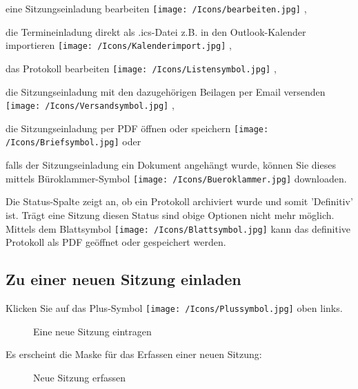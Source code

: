 \begin{compactitem}
	\item eine Sitzungseinladung bearbeiten \texttt{[image: /Icons/bearbeiten.jpg]} ,
	\item die Termineinladung direkt als .ics-Datei z.B. in den Outlook-Kalender importieren \texttt{[image: /Icons/Kalenderimport.jpg]} ,
	\item das Protokoll bearbeiten \texttt{[image: /Icons/Listensymbol.jpg]} ,
	\item die Sitzungseinladung mit den dazugehörigen Beilagen per Email versenden \texttt{[image: /Icons/Versandsymbol.jpg]} ,
	\item die Sitzungseinladung per PDF öffnen oder speichern \texttt{[image: /Icons/Briefsymbol.jpg]}  oder
	\item falls der Sitzungseinladung ein Dokument angehängt wurde, können Sie dieses mittels Büroklammer-Symbol \texttt{[image: /Icons/Bueroklammer.jpg]}  downloaden.
	\end{compactitem}

\vspace{\baselineskip}

Die Status-Spalte  zeigt an, ob ein Protokoll archiviert wurde und somit 'Definitiv' ist. Trägt eine Sitzung diesen Status sind obige Optionen nicht mehr möglich. Mittels dem Blattsymbol \texttt{[image: /Icons/Blattsymbol.jpg]} kann das definitive Protokoll als PDF geöffnet oder gespeichert werden.

\subsection{Zu einer neuen Sitzung einladen}
\label{bkm:Ref434828480}

Klicken Sie auf das Plus-Symbol \texttt{[image: /Icons/Plussymbol.jpg]}  oben links.

\vspace{\baselineskip}

\begin{figure}[H]
\caption{Eine neue Sitzung eintragen}
\end{figure}


Es erscheint die Maske für das Erfassen einer neuen Sitzung:

\begin{figure}[H]
\caption{Neue Sitzung erfassen}
\end{figure}

